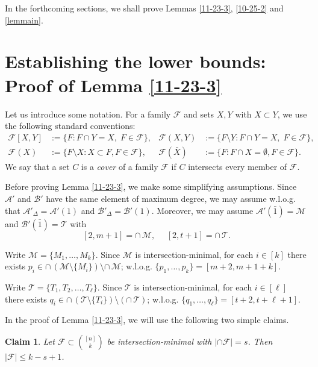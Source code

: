 \documentclass[11pt]{article}
\newcommand{\m}{\mathcal}
\newtheorem{claim}[theorem]{Claim}
\begin{document}
In the forthcoming sections, we shall prove Lemmas \ref{11-23-3}, \ref{10-25-2} and \ref{lemmain}. 


\section{Establishing the lower bounds: Proof of Lemma \ref{11-23-3}}\label{lower}
Let us introduce some notation.  For a family $\m F$ and sets $X, Y$ with $X\subset Y$, we use the following standard conventions:
\begin{align*}
    \mathcal{F}[X, Y] &:=\big\{F: F\cap Y = X,\; F\in \mathcal{F} \big\}, &
    \mathcal{F}(X, Y) &:=\big\{F\setminus Y: F\cap Y = X,\; F\in \mathcal{F} \big\},\\[3pt]
    \mathcal{F}(X) &:=\{F\setminus X: X\subset F, F\in \m F\}, &
    \mathcal{F}(\bar X) &:=\{F: F\cap X=\emptyset, F\in \m F\}.
\end{align*}
We say that a set $C$ is a {\it cover} of a family $\m F$ if $C$ intersects every member of $\m F$.

Before proving Lemma \ref{11-23-3}, we make some simplifying assumptions. Since $\m A'$ and $\m B'$ have the same element of maximum degree,  we may assume w.l.o.g. that $\m A'_{\Delta}=\m A'(1)$ and $\m B'_{\Delta}=\m B'(1)$. Moreover, we may assume $\m A'(\bar{1})=\m M$ and $\m B'(\bar{1})=\m T$ with $$[2,m+1]=\cap \, \m M,\ \ \ \ \ \ [2,t+1]=\cap \, \m T.$$

Write $\mathcal{M}=\{M_1, \dots, M_{k}\}$.
Since $\mathcal{M}$ is intersection-minimal, for each $i\in [k]$ there exists 
$
p_i\in \cap\,(\mathcal{M}\setminus \{M_i\})\setminus \cap \,\mathcal{M}$;
w.l.o.g. $\{p_1, \dots, p_k\}=[m+2, m+1+k]$.

Write $\m T=\{T_1, T_2, \dots, T_{\ell}\}$. Since $\mathcal{T}$ is intersection-minimal, for each $i\in [\ell]$ there exists $q_i\in \cap\,(\mathcal{T}\setminus \{T_i\})\setminus (\cap \,\mathcal{T})$;
w.l.o.g. $\{q_1, \dots, q_{\ell}\}=[t+2, t+\ell+1]$. 








In the proof of Lemma \ref{11-23-3}, 
we will use the following two simple claims. 

\begin{claim}\label{minsize}
    Let $\m F \subset {[n]\choose k}$ be intersection-minimal with $|\cap \m F|=s$. Then $|\m F|\le k-s+1$.
\end{claim}
\end{document}
